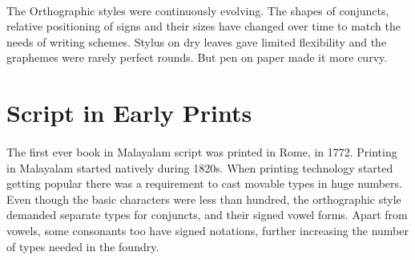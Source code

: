 \documentclass[10pt]{article}
\begin{document}
\paragraph{}

 The Orthographic styles were continuously evolving. The shapes of conjuncts, relative positioning of signs and their sizes have changed over time to match the needs of writing schemes. Stylus on dry leaves gave limited flexibility and the graphemes were rarely perfect rounds. But pen on paper made it more curvy. 



%
%
%
%
%




\section{Script in Early Prints }


\paragraph{}
The first ever book in Malayalam script was printed in Rome, in 1772. Printing in Malayalam started natively during 1820s. When printing technology started getting popular there was a requirement to cast movable types in huge numbers. Even though the basic characters were less than hundred, the orthographic style demanded separate types for conjuncts, and their signed vowel forms. Apart from vowels, some consonants too have signed notations, further increasing the number of types needed in the foundry. 
\end{document}
